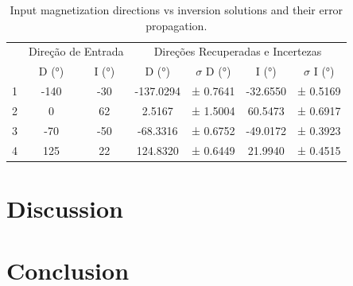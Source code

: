 \documentclass[manuscript,revised]{geophysics}
\begin{document}
\begin{table}[htbp]
\caption{Input magnetization directions vs inversion solutions and their error propagation.}
\label{tab:inversionresults}
\centering
\begin{tabular}[width=1.0\textwidth]{ccccccc}
\rowcolor[HTML]{E7E7E7} 
\cellcolor[HTML]{E7E7E7}                         & \multicolumn{2}{c}{\cellcolor[HTML]{E7E7E7}Direção de Entrada} & \multicolumn{4}{c}{\cellcolor[HTML]{E7E7E7}Direções Recuperadas e   Incertezas} \\
\rowcolor[HTML]{E7E7E7} 
\multirow{-2}{*}{\cellcolor[HTML]{E7E7E7}Esfera} & D (°)                          & I (°)                         & D (°)               & $\sigma$ D (°)            & I (°)             & $\sigma$ I (°)           \\
1                                                & -140                           & -30                           & -137.0294           & ± 0.7641          & -32.6550          & ± 0.5169          \\
\rowcolor[HTML]{E7E7E7} 
2                                                & 0                              & 62                            & 2.5167              & ± 1.5004          & 60.5473           & ± 0.6917          \\
3                                                & -70                            & -50                           & -68.3316            & ± 0.6752          & -49.0172          & ± 0.3923          \\
\rowcolor[HTML]{E7E7E7} 
4                                                & 125                            & 22                            & 124.8320            & ± 0.6449          & 21.9940           & ± 0.4515         
\end{tabular}
\end{table}





\section{Discussion}

\section{Conclusion}


\begin{singlespace}
\doublespacing

\end{singlespace}
\end{document}
